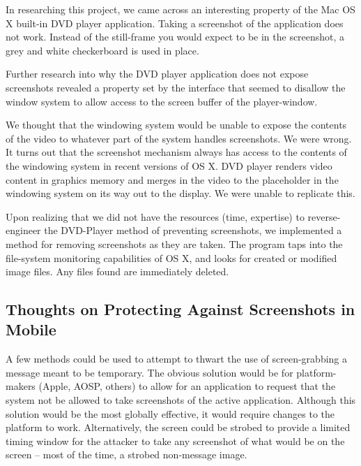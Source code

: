 \documentclass[11pt, a4paper,titlepage]{report}
\begin{document}
In researching this project, we came across an interesting property of the Mac OS X built-in DVD player application. Taking a screenshot of the application does not work. Instead of the still-frame you would expect to be in the screenshot, a grey and white checkerboard %
is used in place. 

Further research into why the DVD player application does not expose screenshots revealed a property set by the interface that seemed to disallow the window system to allow access to the screen buffer of the player-window. %

We thought that the windowing system would be unable to expose the contents of the video to whatever part of the system handles screenshots. We were wrong. It turns out that the screenshot mechanism always has access to the contents of the windowing system in recent versions of OS X. DVD player renders video content in graphics memory and merges in the video to the placeholder in the windowing system on its way out to the display. We were unable to replicate this.

Upon realizing that we did not have the resources (time, expertise) to reverse-engineer the DVD-Player method of preventing screenshots, we implemented a method for removing screenshots as they are taken. The program taps into the file-system monitoring capabilities of OS X, and looks for created or modified image files. Any files found are immediately deleted.

\subsection*{Thoughts on Protecting Against Screenshots in Mobile} 
A few methods could be used to attempt to thwart the use of screen-grabbing a message meant to be temporary. The obvious solution would be for platform-makers (Apple, AOSP, others) to allow for an application to request that the system not be allowed to take screenshots of the active application. Although this solution would be the most globally effective, it would require changes to the platform to work. Alternatively, the screen could be strobed to provide a limited timing window for the attacker to take any screenshot of what would be on the screen -- most of the time, a strobed non-message image.
\end{document}
